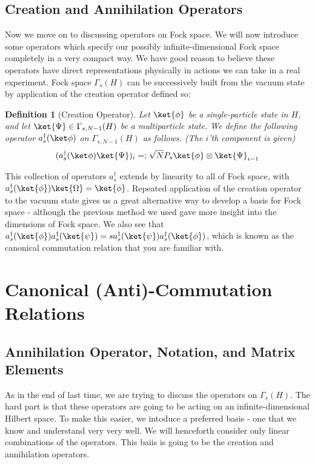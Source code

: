 \documentclass{article}
\newtheorem{defn}{Definition}
\begin{document}
\subsection{Creation and Annihilation Operators}
Now we move on to discussing operators on Fock space. We will now introduce some operators which specify our possibly infinite-dimensional Fock space completely in a very compact way. We have good reason to believe these operators have direct representations physically in actions we can take in a real experiment. Fock space $\Gamma_s(H)$ can be successively built from the vacuum state by application of the creation operator defined so:
\begin{defn}[Creation Operator]
Let $\ket{\phi}$ be a single-particle state in $H$, and let $\ket{\Psi} \in \Gamma_{s,N-1}(H)$ be a multiparticle state. We define the following operator $a^\dagger_s(\ket\phi)$ on $\Gamma_{s,N-1}(H)$ as follows. (The $i$'th component is given)
\[(a_s^\dagger(\ket\phi) \ket{\Psi})_i =: \sqrt{N} P_s \ket{\phi} \otimes \ket{\Psi}_{i-1}\]
\end{defn}
This collection of operators $a^\dagger_s$ extends by linearity to all of Fock space, with $a^\dagger_s(\ket{\phi})\ket{\Omega} = \ket{\phi}$. Repeated application of the creation operator to the vacuum state gives us a great alternative way to develop a basis for Fock space - although the previous method we used gave more insight into the dimensions of Fock space. We also see that $a_s^\dagger(\ket{\phi})a_s^\dagger(\ket{\psi}) = s a^\dagger_s(\ket{\psi}) a^\dagger_s(\ket{\phi})$, which is known as the canonical commutation relation that you are familiar with.
\pagebreak

\section{Canonical (Anti)-Commutation Relations}
\subsection{Annihilation Operator, Notation, and Matrix Elements}
As in the end of last time, we are trying to discuss the operators on $\Gamma_s(H)$. The hard part is that these operators are going to be acting on an infinite-dimensional Hilbert space. To make this easier, we intoduce a preferred basis - one that we know and understand very very well. We will henceforth consider only linear combinations of the operators. This baiis is going to be the creation and annihilation operators.
\end{document}

